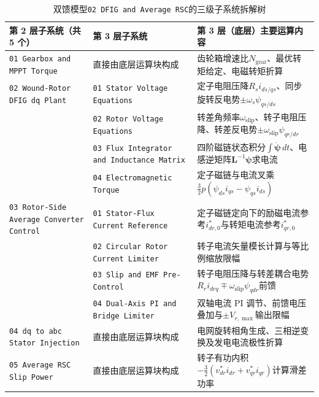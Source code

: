 \documentclass[UTF8,zihao=-4,fontset=none]{ctexrep}
\begin{document}
\begin{table}[H]
\centering
\caption{双馈模型\texttt{02 DFIG and Average RSC}的三级子系统拆解树}
\label{tab:dfig_tree}
\begin{tabular}{p{4.3cm}p{4.6cm}p{4.2cm}}
\toprule
第 2 层子系统（共 5 个） & 第 3 层子系统 & 第 3 层（底层）主要运算内容\\
\midrule
\texttt{01 Gearbox and MPPT Torque} & 直接由底层运算块构成 & 齿轮箱增速比\(N_{\mathrm{gear}}\)、最优转矩给定、电磁转矩折算\\
\texttt{02 Wound-Rotor DFIG dq Plant} & \texttt{01 Stator Voltage Equations} & 定子电阻压降\(R_si_{ds/qs}\)、同步旋转反电势\(\pm\omega_s\psi_{qs/ds}\)\\
 & \texttt{02 Rotor Voltage Equations} & 转差角频率\(\omega_{\mathrm{slip}}\)、转子电阻压降、转差反电势\(\pm\omega_{\mathrm{slip}}\psi_{qr/dr}\)\\
 & \texttt{03 Flux Integrator and Inductance Matrix} & 四阶磁链状态积分\(\int\dot{\boldsymbol{\psi}}\,dt\)、电感逆矩阵\(\mathbf{L}^{-1}\boldsymbol{\psi}\)求电流\\
 & \texttt{04 Electromagnetic Torque} & 定子磁链与电流叉乘\(\frac{3}{2}p(\psi_{ds}i_{qs}-\psi_{qs}i_{ds})\)\\
\texttt{03 Rotor-Side Average Converter Control} & \texttt{01 Stator-Flux Current Reference} & 定子磁链定向下的励磁电流参考\(i_{dr,0}^*\)与转矩电流参考\(i_{qr,0}^*\)\\
 & \texttt{02 Circular Rotor Current Limiter} & 转子电流矢量模长计算与等比例缩放限幅\\
 & \texttt{03 Slip and EMF Pre-Control} & 转子电阻压降与转差耦合电势\(R_ri_{drq}\mp\omega_{\mathrm{slip}}\psi_{qdr}\)前馈\\
 & \texttt{04 Dual-Axis PI and Bridge Limiter} & 双轴电流 PI 调节、前馈电压叠加与\(\pm V_{r,\max}\)输出限幅\\
\texttt{04 dq to abc Stator Injection} & 直接由底层运算块构成 & 电网旋转相角生成、三相逆变换及发电电流极性折算\\
\texttt{05 Average RSC Slip Power} & 直接由底层运算块构成 & 转子有功内积\(-\frac{3}{2}(v_{dr}^*i_{dr}+v_{qr}^*i_{qr})\)计算滑差功率\\
\bottomrule
\end{tabular}
\end{table}
\end{document}
